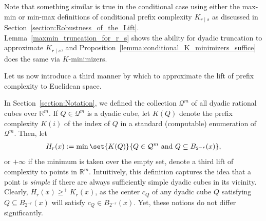 Note that something similar is true in the conditional case using either the max-min or min-max definitions of conditional prefix complexity $K_{r \mid s}$ as discussed in Section~\ref{section:Robustness_of_the_Lift}. Lemma~\ref{maxmin_truncation_for_r_s} shows the ability for dyadic truncation to approximate $K_{r \mid s}$, and Proposition~\ref{lemma:conditional_K_minimizers_suffice} does the same via $K$-minimizers. 

Let us now introduce a third manner by which to approximate the lift of prefix complexity to Euclidean space.

In Section~\ref{section:Notation}, we defined the collection $\mathcal{Q}^m$ of all dyadic rational cubes over $\mathbb{R}^m$. If $Q \in \mathcal{Q}^m$ is a dyadic cube, let $K(Q)$ denote the prefix complexity $K(i)$ of the index of $Q$ in a standard (computable) enumeration of $\mathcal{Q}^m$. Then, let
\begin{align*}
    H_r(x) := \min \set{K(Q)}{Q \in \mathcal{Q}^m \text{ and } Q \subseteq B_{2^{-r}}(x)},
\end{align*}
or $+\infty$ if the minimum is taken over the empty set, denote a third lift of complexity to points in $\mathbb{R}^m$. Intuitively, this definition captures the idea that a point is \textit{simple} if there are always sufficiently simple dyadic cubes in its vicinity. Clearly, $H_r(x) \geq^+ K_r(x)$, as the center $c_Q$ of any dyadic cube $Q$ satisfying $Q \subseteq B_{2^{-r}}(x)$ will satisfy $c_Q \in B_{2^{-r}}(x)$. Yet, these notions do not differ significantly.

